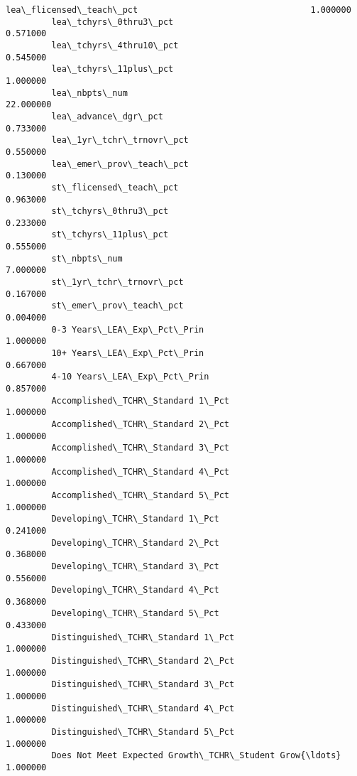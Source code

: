 \documentclass[11pt]{article}
\begin{document}
\begin{Verbatim}[commandchars=\\\{\}]
         lea\_flicensed\_teach\_pct                                  1.000000  
         lea\_tchyrs\_0thru3\_pct                                    0.571000  
         lea\_tchyrs\_4thru10\_pct                                   0.545000  
         lea\_tchyrs\_11plus\_pct                                    1.000000  
         lea\_nbpts\_num                                           22.000000  
         lea\_advance\_dgr\_pct                                      0.733000  
         lea\_1yr\_tchr\_trnovr\_pct                                  0.550000  
         lea\_emer\_prov\_teach\_pct                                  0.130000  
         st\_flicensed\_teach\_pct                                   0.963000  
         st\_tchyrs\_0thru3\_pct                                     0.233000  
         st\_tchyrs\_11plus\_pct                                     0.555000  
         st\_nbpts\_num                                             7.000000  
         st\_1yr\_tchr\_trnovr\_pct                                   0.167000  
         st\_emer\_prov\_teach\_pct                                   0.004000  
         0-3 Years\_LEA\_Exp\_Pct\_Prin                               1.000000  
         10+ Years\_LEA\_Exp\_Pct\_Prin                               0.667000  
         4-10 Years\_LEA\_Exp\_Pct\_Prin                              0.857000  
         Accomplished\_TCHR\_Standard 1\_Pct                         1.000000  
         Accomplished\_TCHR\_Standard 2\_Pct                         1.000000  
         Accomplished\_TCHR\_Standard 3\_Pct                         1.000000  
         Accomplished\_TCHR\_Standard 4\_Pct                         1.000000  
         Accomplished\_TCHR\_Standard 5\_Pct                         1.000000  
         Developing\_TCHR\_Standard 1\_Pct                           0.241000  
         Developing\_TCHR\_Standard 2\_Pct                           0.368000  
         Developing\_TCHR\_Standard 3\_Pct                           0.556000  
         Developing\_TCHR\_Standard 4\_Pct                           0.368000  
         Developing\_TCHR\_Standard 5\_Pct                           0.433000  
         Distinguished\_TCHR\_Standard 1\_Pct                        1.000000  
         Distinguished\_TCHR\_Standard 2\_Pct                        1.000000  
         Distinguished\_TCHR\_Standard 3\_Pct                        1.000000  
         Distinguished\_TCHR\_Standard 4\_Pct                        1.000000  
         Distinguished\_TCHR\_Standard 5\_Pct                        1.000000  
         Does Not Meet Expected Growth\_TCHR\_Student Grow{\ldots}       1.000000  

\end{Verbatim}
\end{document}
